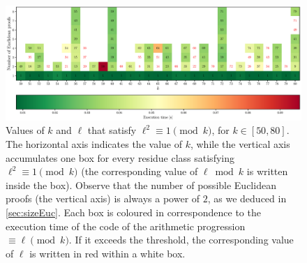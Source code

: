 \documentclass[../main.tex]{subfiles}
\begin{document}
\begin{figure}
	\centering
	\vspace*{-3in}
	\includegraphics[width=\textwidth]{Images/running_times_50_80.eps}
	\caption{Values of $k$ and $\ell$ that satisfy $\ell^2\equiv 1 \pmod{k}$, for $k\in[50,80]$. The horizontal axis indicates the value of $k$, while the vertical axis accumulates one box for every residue class satisfying $\ell^2\equiv 1 \pmod{k}$ (the corresponding value of $\ell \bmod{k}$ is written inside the box). Observe that the number of possible Euclidean proofs (the vertical axis) is always a power of $2$, as we deduced in \cref{sec:sizeEuc}. Each box is coloured in correspondence to the execution time of the code of the arithmetic progression $\equiv\ell\pmod{k}$. If it exceeds the threshold, the corresponding value of $\ell$ is written in red within a white box.} 
	\label{fig:colouredmatrix2}
\end{figure}

\end{document}
